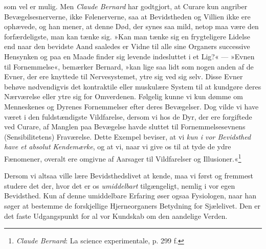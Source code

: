 \documentclass[12pt,a4paper,openany]{book}
\newcommand{\opage}[1]{\marginnote{\footnotesize\textit{[#1]}}}
\begin{document}
\opage{13}som vel er mulig. Men \emph{Claude Bernard} har godtgjort, at
Curare kun angriber Bevægelsesnerverne, ikke Følenerverne, saa at
Bevidstheden og Villien ikke ere ophævede, og han mener, at denne Død,
der synes saa mild, netop maa være den forfærdeligste, man kan tænke
sig. »Kan man tænke sig en frygteligere Lidelse end naar den bevidste
Aand saaledes er Vidne til alle sine Organers successive Hensynken og
paa en Maade finder sig levende indesluttet i et Lig?« --- »Evnen til
Fornemmelse«, bemærker Bernard, »kan lige saa lidt som nogen anden af de
Evner, der ere knyttede til Nervesystemet, ytre sig ved sig selv. Disse
Evner behøve nødvendigvis det kontraktile eller muskulære System til at
kundgøre deres Nærværelse eller ytre sig for Omverdenen. Følgelig kunne
vi kun dømme om Menneskenes og Dyrenes Fornemmelser efter deres
Bevægelser. Dog vilde vi have været i den fuldstændigste Vildfarelse,
dersom vi hos de Dyr, der ere forgiftede ved Curare, af Manglen paa
Bevægelse havde sluttet til Fornemmelsesevnens (Sensibilitetens)
Fraværelse. Dette Exempel beviser, at vi \emph{kun i vor Bevidsthed have
et absolut Kendemærke}, og at vi, naar vi give os til at tyde de ydre
Fænomener, overalt ere omgivne af Aarsager til Vildfarelser og
Illusioner.«\footnote[1]{\emph{Claude Bernard}: La science experimentale, p.
299 f.}

Dersom vi altsaa ville lære Bevidsthedslivet at kende, maa vi først og
fremmest studere det der, hvor det er os \emph{umiddelbart}
tilgængeligt, nemlig i vor egen Bevidsthed. Kun af denne umiddelbare
Erfaring øser ogsaa Fysiologen, naar han søger at bestemme de
forskjellige Hjerneorganers Betydning for Sjælelivet. Den er det faste
Udgangspunkt for al vor Kundskab om den aandelige Verden.
\end{document}
